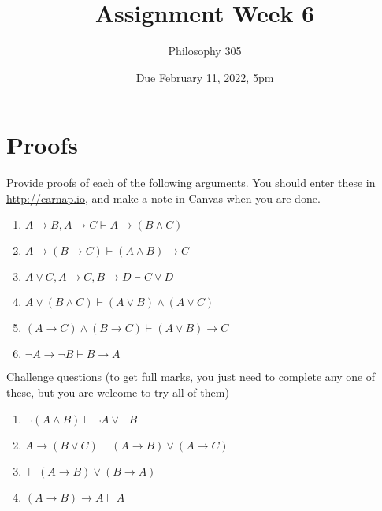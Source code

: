 \documentclass[
  11pt,
]{article}
\title{Assignment Week 6}
\author{Philosophy 305}
\date{Due February 11, 2022, 5pm}
\providecommand{\tightlist}{%
  \setlength{\itemsep}{0pt}\setlength{\parskip}{0pt}}
\begin{document}
\maketitle

\hypertarget{proofs}{%
\section{Proofs}\label{proofs}}

Provide proofs of each of the following arguments. You should enter
these in \url{http://carnap.io}, and make a note in Canvas when you are
done.

\begin{enumerate}
\def\labelenumi{\arabic{enumi}.}
\tightlist
\item
  \(A \rightarrow B, A \rightarrow C \vdash A \rightarrow (B \wedge C)\)
\item
  \(A \rightarrow (B \rightarrow C) \vdash (A \wedge B) \rightarrow C\)
\item
  \(A \vee C, A \rightarrow C, B \rightarrow D \vdash C \vee D\)
\item
  \(A \vee (B \wedge C) \vdash (A \vee B) \wedge (A \vee C)\)
\item
  \((A \rightarrow C) \wedge (B \rightarrow C) \vdash (A \vee B) \rightarrow C\)
\item
  \(\neg A \rightarrow \neg B \vdash B \rightarrow A\)
\end{enumerate}

Challenge questions (to get full marks, you just need to complete any
one of these, but you are welcome to try all of them)

\begin{enumerate}
\def\labelenumi{\arabic{enumi}.}
\setcounter{enumi}{6}
\tightlist
\item
  \(\neg (A \wedge B) \vdash \neg A \vee \neg B\)
\item
  \(A \rightarrow (B \vee C) \vdash (A \rightarrow B) \vee (A \rightarrow C)\)
\item
  \(\vdash (A \rightarrow B) \vee (B \rightarrow A)\)
\item
  \((A \rightarrow B) \rightarrow A \vdash A\)
\end{enumerate}
\end{document}
